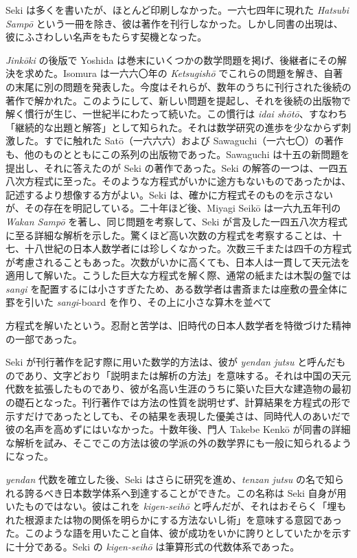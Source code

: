 \documentclass[11pt]{article}
\newcommand{\scanpage}[2]{\clearpage\setcounter{footnote}{0}\noindent{\footnotesize\color{gray}PDF #1 頁 · #2}\par\medskip}
\newcommand{\scanfooter}{}
\begin{document}
Seki は多くを書いたが、ほとんど印刷しなかった。一六七四年に現れた \emph{Hatsubi Sampō} という一冊を除き、彼は著作を刊行しなかった。しかし同書の出現は、彼にふさわしい名声をもたらす契機となった。

\emph{Jinkōki} の後版で Yoshida は巻末にいくつかの数学問題を掲げ、後継者にその解決を求めた。Isomura は一六六〇年の \emph{Ketsugishō} でこれらの問題を解き、自著の末尾に別の問題を発表した。今度はそれらが、数年のうちに刊行された後続の著作で解かれた。このようにして、新しい問題を提起し、それを後続の出版物で解く慣行が生じ、一世紀半にわたって続いた。この慣行は \emph{idai shōtō}、すなわち「継続的な出題と解答」として知られた。それは数学研究の進歩を少なからず刺激した。すでに触れた Satō（一六六六）および Sawaguchi（一六七〇）の著作も、他のものとともにこの系列の出版物であった。Sawaguchi は十五の新問題を提出し、それに答えたのが Seki の著作であった。Seki の解答の一つは、一四五八次方程式に至った。そのような方程式がいかに途方もないものであったかは、記述するより想像する方がよい。Seki は、確かに方程式そのものを示さないが、その存在を明記している。二十年ほど後、Miyagi Seikō は一六九五年刊の \emph{Wakan Sampō} を著し、同じ問題を考察して、Seki が言及した一四五八次方程式に至る詳細な解析を示した。驚くほど高い次数の方程式を考察することは、十七、十八世紀の日本人数学者には珍しくなかった。次数三千または四千の方程式が考慮されることもあった。次数がいかに高くても、日本人は一貫して天元法を適用して解いた。こうした巨大な方程式を解く際、通常の紙または木製の盤では \emph{sangi} を配置するには小さすぎたため、ある数学者は書斎または座敷の畳全体に罫を引いた \emph{sangi}-board を作り、その上に小さな算木を並べて
\scanfooter

\scanpage{0174}{第22章、印刷頁160}
方程式を解いたという。忍耐と苦学は、旧時代の日本人数学者を特徴づけた精神の一部であった。

Seki が刊行著作を記す際に用いた数学的方法は、彼が \emph{yendan jutsu} と呼んだものであり、文字どおり「説明または解析の方法」を意味する。それは中国の天元代数を拡張したものであり、彼が名高い生涯のうちに築いた巨大な建造物の最初の礎石となった。刊行著作では方法の性質を説明せず、計算結果を方程式の形で示すだけであったとしても、その結果を表現した優美さは、同時代人のあいだで彼の名声を高めずにはいなかった。十数年後、門人 Takebe Kenkō が同書の詳細な解析を試み、そこでこの方法は彼の学派の外の数学界にも一般に知られるようになった。

\emph{yendan} 代数を確立した後、Seki はさらに研究を進め、\emph{tenzan jutsu} の名で知られる誇るべき日本数学体系へ到達することができた。この名称は Seki 自身が用いたものではない。彼はこれを \emph{kigen-seihō} と呼んだが、それはおそらく「埋もれた根源または物の関係を明らかにする方法ないし術」を意味する意図であった。このような語を用いたこと自体、彼が成功をいかに誇りとしていたかを示すに十分である。Seki の \emph{kigen-seihō} は筆算形式の代数体系であった。
\end{document}
